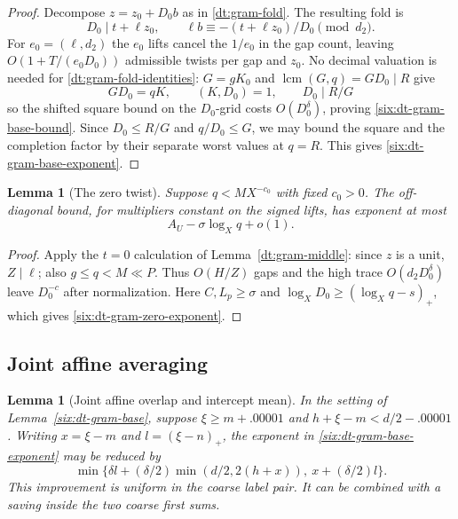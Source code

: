 \documentclass[11pt,a4paper]{article}
\theoremstyle{paperplain}
\newtheorem{lemma}[theorem]{Lemma}
\numberwithin{equation}{section}
\begin{document}
\begin{proof}
Decompose $z=z_0+D_0 b$ as in \eqref{dt:gram-fold}. The resulting fold is
\begin{equation}
 D_0\mid t+\ell z_0,\qquad
 \ell b\equiv -(t+\ell z_0)/D_0\pmod{d_2}.
 \label{six:dt-gram-fold}
\end{equation}
For $e_0=(\ell,d_2)$ the $e_0$ lifts cancel the $1/e_0$ in the
gap count, leaving $O(1+T/(e_0D_0))$ admissible twists per gap and
$z_0$. No decimal valuation is needed for \eqref{dt:gram-fold-identities}:
$G=gK_0$ and $\operatorname{lcm}(G,q)=GD_0\mid R$ give
\begin{equation}
 GD_0=qK,\qquad (K,D_0)=1,\qquad D_0\mid R/G
 \label{six:dt-gram-fold-identities}
\end{equation}
so the shifted square bound on the $D_0$-grid costs $O(D_0^\delta)$,
proving \eqref{six:dt-gram-base-bound}.
Since \(D_0\le R/G\) and \(q/D_0\le G\), we may bound the
square and the completion factor by their separate worst
values at \(q=R\). This gives \eqref{six:dt-gram-base-exponent}.
\end{proof}

\begin{lemma}[The zero twist]\label{six:dt-gram-middle}
Suppose \(q<MX^{-c_0}\) with fixed \(c_0>0\). The
off-diagonal bound, for multipliers constant on the signed
lifts, has exponent at most
\begin{equation}
                A_U-\sigma\log_X q+o(1).
 \label{six:dt-gram-zero-exponent}
\end{equation}
\end{lemma}

\begin{proof}
Apply the $t=0$ calculation of Lemma~\ref{dt:gram-middle}: since $z$
is a unit, $Z\mid\ell$; also $g\le q<M\ll P$. Thus $O(H/Z)$ gaps and
the high trace $O(d_2D_0^\delta)$ leave $D_0^{-c}$ after normalization.
Here $C,L_p\ge\sigma$ and $\log_XD_0\ge(\log_Xq-s)_+$, which gives
\eqref{six:dt-gram-zero-exponent}.
\end{proof}

\subsection{Joint affine averaging}

\begin{lemma}[Joint affine overlap and intercept mean]\label{six:dt-gram-joint}
In the setting of Lemma~\ref{six:dt-gram-base}, suppose $\xi\ge m+.00001$ and
$h+\xi-m<d/2-.00001$. Writing $x=\xi-m$ and $l=(\xi-n)_+$,
the exponent in \eqref{six:dt-gram-base-exponent} may be reduced by
\begin{equation}\label{six:dt-gram-joint-gain}
 \min\{\delta l+(\delta/2)\min(d/2,2(h+x)),\ x+(\delta/2)l\}.
\end{equation}
This improvement is uniform in the coarse label pair. It can be
combined with a saving inside the two coarse first sums.
\end{lemma}
\end{document}
